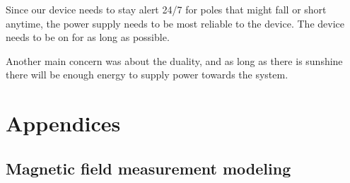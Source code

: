 \documentclass[12pt]{article}
\begin{document}


Since our device needs to stay alert 24/7 for poles that might fall or short anytime, the power supply needs to be most reliable to the device. The device needs to be on for as long as possible. 

Another main concern was about the duality, and as long as there is sunshine there will be enough energy to supply power towards the system.  

\printbibliography

\section{Appendices}
\subsection{Magnetic field measurement modeling}
\end{document}
